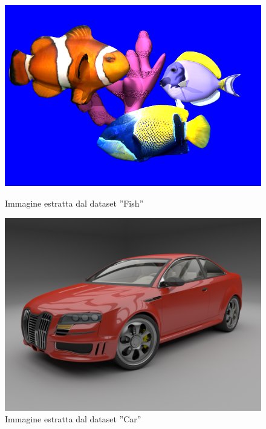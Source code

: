 \begin{figure}[ht]
    \begin{minipage}[b]{0.32\linewidth}
        \centering
        \includegraphics[width=\linewidth]{img/Fish.png}
        \caption{Immagine estratta dal dataset ”Fish”}
        \label{fig:Fish}
    \end{minipage}
    \hfill
    \begin{minipage}[b]{0.32\linewidth}
        \centering
        \includegraphics[width=\linewidth]{img/Car.png}
        \caption{Immagine estratta dal dataset ”Car”}
        \label{fig:Car}
    \end{minipage}
\end{figure}

